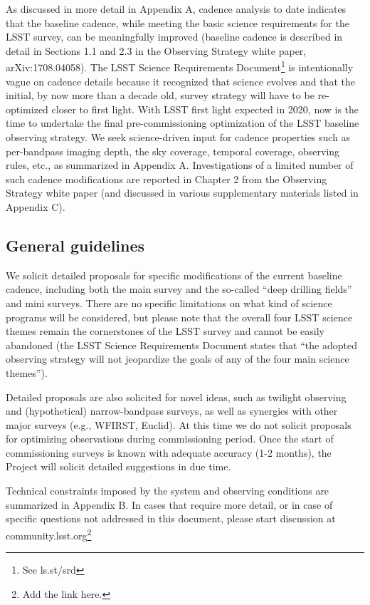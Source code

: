 \documentclass[DM,lsstdraft,toc,usenatbib]{lsstdoc}
\begin{document}
As discussed in more detail in Appendix A, cadence analysis to date indicates that the baseline 
cadence, while meeting the basic science requirements for the LSST survey, can be meaningfully 
improved (baseline cadence is described in detail in Sections 1.1 and 2.3 in the Observing Strategy
white paper, arXiv:1708.04058). The LSST Science Requirements Document\footnote{See ls.st/srd} 
is intentionally vague on cadence details because it recognized that science evolves and that the 
initial, by now more than a decade old, survey strategy will have to be re-optimized closer to first 
light. With LSST first light expected in 2020, now is the time to undertake the final pre-commissioning
optimization of the LSST baseline observing strategy. We seek science-driven input for cadence 
properties such as per-bandpass imaging depth, the sky coverage, temporal coverage, observing
rules, etc., as summarized in Appendix A. Investigations of a limited number of such cadence 
modifications are reported in Chapter 2 from the Observing Strategy white paper (and discussed 
in various supplementary materials listed in Appendix C). 



\subsection{General guidelines} 

We solicit detailed proposals for specific modifications of the current baseline cadence, including 
both the main survey and the so-called ``deep drilling fields'' and mini surveys. There are no 
specific limitations on what kind of science programs will be considered, but please note that 
the overall four LSST science themes remain the cornerstones of the LSST survey and cannot 
be easily abandoned (the LSST Science Requirements Document states that ``the adopted observing 
strategy will not jeopardize the goals of any of the four main science themes''). 

Detailed proposals are also solicited for novel ideas, such as twilight observing and (hypothetical) 
narrow-bandpass surveys, as well as synergies with other major surveys (e.g., WFIRST, Euclid). At this 
time we do not solicit proposals for optimizing observations during commissioning period. Once 
the start of commissioning surveys is known with adequate accuracy (1-2 months), the Project will 
solicit detailed suggestions in due time. 

Technical constraints imposed by the system and observing conditions are summarized in 
Appendix B. In cases that require more detail, or in case of specific questions not addressed in this 
document, please start discussion at community.lsst.org\footnote{Add the link here.} 
\end{document}
